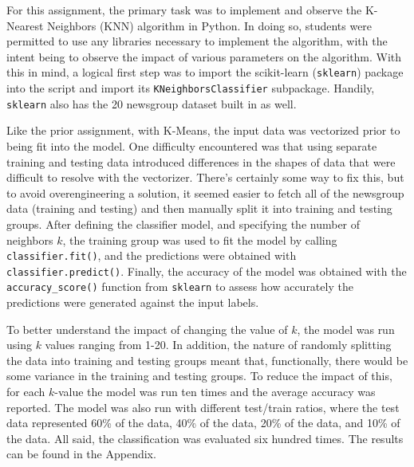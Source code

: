 \documentclass[11pt]{article}
\begin{document}
  
  \graphicspath{{./images/}}
\newpage
For this assignment, the primary task was to implement and observe the K-Nearest Neighbors (KNN) algorithm in Python.
In doing so, students were permitted to use any libraries necessary to implement the algorithm, with the intent being to observe the impact of various parameters on the algorithm.
With this in mind, a logical first step was to import the scikit-learn (\lstinline{sklearn}) package into the script and import its \lstinline{KNeighborsClassifier} subpackage.
Handily, \lstinline{sklearn} also has the 20 newsgroup dataset built in as well.

Like the prior assignment, with K-Means, the input data was vectorized prior to being fit into the model.
One difficulty encountered was that using separate training and testing data introduced differences in the shapes of data that were difficult to resolve with the vectorizer.
There's certainly some way to fix this, but to avoid overengineering a solution, it seemed easier to fetch all of the newsgroup data (training and testing) and then manually split it into training and testing groups.
After defining the classifier model, and specifying the number of neighbors $k$, the training group was used to fit the model by calling \lstinline{classifier.fit()}, and the predictions were obtained with \lstinline{classifier.predict()}.
Finally, the accuracy of the model was obtained with the \lstinline{accuracy_score()} function from \lstinline{sklearn} to assess how accurately the predictions were generated against the input labels.

To better understand the impact of changing the value of $k$, the model was run using $k$ values ranging from 1-20.
In addition, the nature of randomly splitting the data into training and testing groups meant that, functionally, there would be some variance in the training and testing groups. 
To reduce the impact of this, for each $k$-value the model was run ten times and the average accuracy was reported.
The model was also run with different test/train ratios, where the test data represented 60\% of the data, 40\% of the data, 20\% of the data, and 10\% of the data.
All said, the classification was evaluated six hundred times.
The results can be found in the  Appendix.
\end{document}
